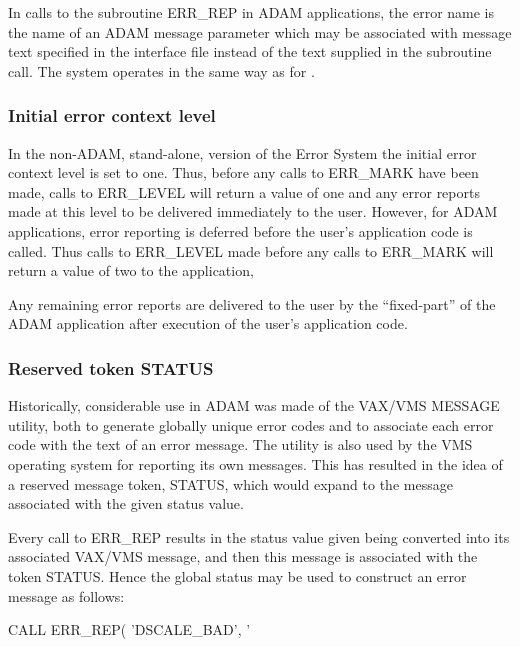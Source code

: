 \documentclass[twoside,11pt]{starlink}
\begin{document}
In calls to the subroutine ERR\_REP in ADAM applications, the error name is the
name of an ADAM message parameter which may be associated with message text
specified in the interface file instead of the text supplied in the subroutine
call.
The system operates in the same way as for
.

\subsubsection{Initial error context level}
In the non-ADAM, stand-alone, version of the Error System the initial error
context level is set to one.
Thus, before any calls to ERR\_MARK have been made, calls to ERR\_LEVEL will
return a value of one and any error reports made at this level to be delivered
immediately to the user.
However, for ADAM applications, error reporting is deferred before
the user's application code is called.
Thus calls to ERR\_LEVEL made before any calls to ERR\_MARK will return a
value of two to the application,

Any remaining error reports are delivered to the user by the ``fixed-part''
of the ADAM application after execution of
the user's application code.


\subsubsection{Reserved token STATUS \label{restok}}
Historically, considerable use in ADAM was made of the VAX/VMS MESSAGE utility,
both to generate globally unique error codes and to associate each error code
with the text of an error message.
The utility is also used by the VMS operating system for reporting
its own messages.
This has resulted in the idea of
a reserved message token, STATUS, which would expand to the message associated
with the given status value.

Every call to ERR\_REP results in the status value given being converted into
its associated VAX/VMS message, and then this message is associated with the
token STATUS.
Hence the global status may be used to construct an error message as follows:

\begin {small}
\begin{terminalv}
CALL ERR_REP( 'DSCALE_BAD', '%
\end{terminalv}
\end {small}
\end{document}
